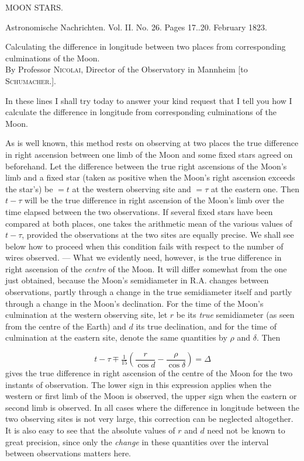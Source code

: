 \clearpage
{}
\hypertarget{native-448-mondsterne}{}
\begin{center}
{\large MOON STARS.}
\end{center}

\begin{center}
Astronomische Nachrichten. Vol. II. No. 26. Pages 17..20. February 1823.
\end{center}

\begin{center}
Calculating the difference in longitude between two places from corresponding culminations of the Moon.\\
By Professor \textsc{Nicolai}, Director of the Observatory in Mannheim [to \textsc{Schumacher.}].
\end{center}

In these lines I shall try today to answer your kind request that I tell you how I calculate the difference in longitude from corresponding culminations of the Moon.

As is well known, this method rests on observing at two places the true difference in right ascension between one limb of the Moon and some fixed stars agreed on beforehand. Let the difference between the true right ascensions of the Moon's limb and a fixed star (taken as positive when the Moon's right ascension exceeds the star's) be $=t$ at the western observing site and $=\tau$ at the eastern one. Then $t-\tau$ will be the true difference in right ascension of the Moon's limb over the time elapsed between the two observations. If several fixed stars have been compared at both places, one takes the arithmetic mean of the various values of $t-\tau$, provided the observations at the two sites are equally precise. We shall see below how to proceed when this condition fails with respect to the number of wires observed. --- What we evidently need, however, is the true difference in right ascension of the \emph{centre} of the Moon. It will differ somewhat from the one just obtained, because the Moon's semidiameter in R.A. changes between observations, partly through a change in the true semidiameter itself and partly through a change in the Moon's declination. For the time of the Moon's culmination at the western observing site, let $r$ be its \emph{true} semidiameter (as seen from the centre of the Earth) and $d$ its true declination, and for the time of culmination at the eastern site, denote the same quantities by $\rho$ and $\delta$. Then

\[
t-\tau \mp \tfrac{1}{15}\left(\frac{r}{\cos d}-\frac{\rho}{\cos\delta}\right) = \Delta
\]
\noindent gives the true difference in right ascension of the centre of the Moon for the two instants of observation. The lower sign in this expression applies when the western or first limb of the Moon is observed, the upper sign when the eastern or second limb is observed. In all cases where the difference in longitude between the two observing sites is not very large, this correction can be neglected altogether. It is also
%
easy to see that the absolute values of $r$ and $d$ need not be known to great precision, since only the \emph{change} in these quantities over the interval between observations matters here.

